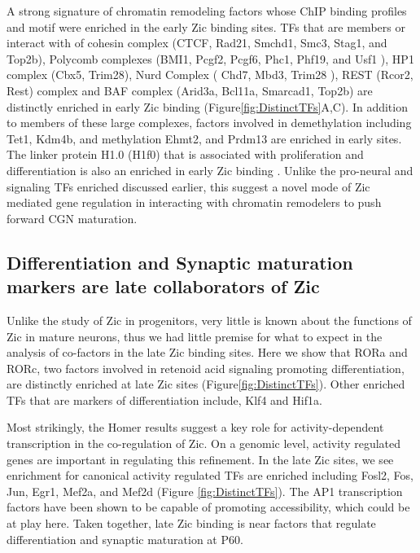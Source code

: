 \documentclass[fleqn,10pt]{wlscirep}
\begin{document}
A strong signature of chromatin remodeling factors whose ChIP binding profiles and motif were enriched in the early Zic binding sites. TFs that are members or interact with of cohesin complex  (CTCF, Rad21, Smchd1, Smc3, Stag1, and Top2b), Polycomb  complexes (BMI1, Pcgf2, Pcgf6, Phc1, Phf19, and Usf1 ), HP1 complex (Cbx5, Trim28), Nurd Complex ( Chd7, Mbd3, Trim28 ), REST (Rcor2, Rest) complex and BAF complex (Arid3a, Bcl11a, Smarcad1, Top2b) are distinctly enriched in early Zic binding (Figure\ref{fig:DistinctTFs}A,C). In addition to members of these large complexes, factors involved in demethylation including Tet1, Kdm4b, and methylation Ehmt2, and Prdm13 are enriched in early sites. The linker protein H1.0 (H1f0) that is associated with proliferation and differentiation is also an enriched in early Zic binding \cite{DiLiegro2018H1.0Differentiation}. Unlike the pro-neural and signaling TFs enriched discussed earlier, this suggest a novel mode of Zic mediated gene regulation in interacting with chromatin remodelers to push forward CGN maturation.

\subsection*{Differentiation and Synaptic maturation markers are late collaborators of Zic}

Unlike the study of Zic in progenitors, very little is known about the functions of Zic in mature neurons, thus we had little premise for what to expect in the analysis of co-factors in the late Zic binding sites.  Here we show that RORa and RORc, two factors involved in retenoid acid signaling promoting differentiation, are distinctly enriched at late Zic sites (Figure\ref{fig:DistinctTFs}). Other enriched TFs that are markers of differentiation include, Klf4 and Hif1a\cite{}. 

Most strikingly, the Homer results suggest a key role for activity-dependent transcription in the co-regulation of Zic. On a genomic level, activity regulated genes are important in regulating this refinement. In the late Zic sites, we see enrichment for canonical activity regulated TFs are enriched  including Fosl2, Fos, Jun, Egr1, Mef2a, and Mef2d (Figure \ref{fig:DistinctTFs}). The AP1 transcription factors have been shown to be capable of promoting accessibility, which could be at play here.  Taken together, late Zic binding is near factors that regulate differentiation and synaptic maturation at P60. 
\end{document}
